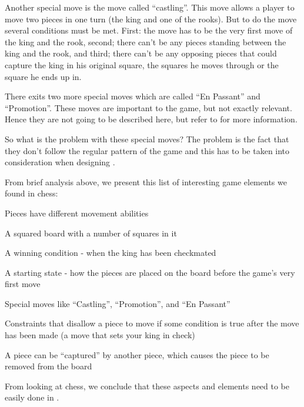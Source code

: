 Another special move is the move called ``castling''. This move allows a player
to move two pieces in one turn (the king and one of the rooks). But to do the
move several conditions must be met. First: the move has to be the very first
move of the king and the rook, second; there can't be any pieces standing
between the king and the rook, and third; there can't be any opposing pieces
that could capture the king in his original square, the squares he moves through
or the square he ends up in.
\cite{chessrules} 

There exits two more special moves which are called ``En Passant'' and
``Promotion''. These moves are important to the game, but not exactly
relevant. Hence they are not going to be described here, but refer to
\cite{chessrules} for more information.

So what is the problem with these special moves? The problem is the fact that
they don't follow the regular pattern of the game and this has to be taken into
consideration when designing \productname{}.


From brief analysis above, we present this list of interesting game elements we found 
in chess:

\begin{dlist}
\item Pieces have different movement abilities
\item A squared board with a number of squares in it
\item A winning condition - when the king has been checkmated
\item A starting state - how the pieces are placed on the board before the
  game's very first move
\item Special moves like ``Castling'', ``Promotion'', and ``En Passant''
\item Constraints that disallow a piece to move if some condition is true after
  the move has been made (a move that sets your king in check)
\item A piece can be ``captured'' by another piece, which causes the piece to be
  removed from the board
\end{dlist}

From looking at chess, we conclude that these aspects and elements need to be easily done in \productname{}.

